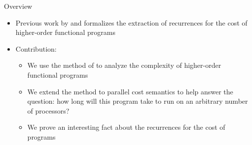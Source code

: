 \documentclass[pdf]{beamer}
\begin{document}
\begin{frame}{Overview}
  \begin{itemize}
    \vfill
    \item<1-> Previous work by \citet{Danner2013} and \citet{Danner2015} formalizes the extraction of recurrences for the cost of higher-order functional programs
    \vfill
    \item<1-> Contribution:
      \begin{itemize}
          \item<1-> We use the method of \citet{Danner2015} to analyze the complexity of higher-order functional programs
          \vfill
          \item<1-> We extend the method to parallel cost semantics to help answer the question: how long will this program take to run on an arbitrary number of processors?
          \vfill
          \item<1-> We prove an interesting fact about the recurrences for the cost of programs
        \end{itemize}
    \vfill
  \end{itemize}
\end{frame}
\end{document}
